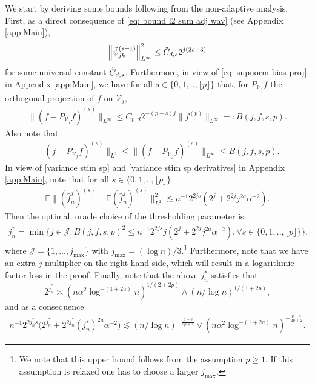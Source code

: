 \documentclass[preprint]{imsart}
\newcommand{\E}{{\mathbb E}}
\newcommand\norm[1]{\left\lVert#1\right\rVert}
\numberwithin{equation}{section}
\begin{document}
We start by deriving some bounds following from the non-adaptive analysis. First, as a direct consequence of \eqref{eq: bound l2 sum adj wav} (see Appendix \ref{app:Main}),
\begin{align}
 \norm{\tilde\psi_{jk}^{(s+1)}}_{L^\infty}^2\leq \Tilde{C}_{d,s} 2^{j(2s+3)}\label{UB:basis:deriv}
\end{align}
for some universal constant $\Tilde{C}_{d,s}$. Furthermore, in view of \eqref{eq: supnorm bias proj} in Appendix \ref{app:Main}, we have for all $s\in\{0,1,..,\lfloor p\rfloor\}$ that, for $P_{\mathcal{V}_j} f$ the orthogonal projection of $f$ on $\mathcal{V}_j$,
\begin{align}
\|(f-P_{\mathcal{V}_j} f)^{(s)}\|_{L^\infty}\leq C_{p,d} 2^{-(p-s) j}\|f^{(p)}\|_{L^{\infty}}=:B(j,f,s,p).\label{eq:def:B}
\end{align}
Also note that
\begin{align*}
\|( f-P_{\mathcal{V}_j} f)^{(s)}\|_{L^2}\leq \| (f-P_{\mathcal{V}_j} f)^{(s)}\|_{L^\infty}\leq B(j,f,s,p).
\end{align*}
In view of \eqref{variance stim sp} and \eqref{variance stim sp derivatives} in Appendix \ref{app:Main}, note that for all $s\in\{0,1,..,\lfloor p\rfloor\}$
\begin{align}
\E\|(\hat{f}_{n}^{j})^{(s)}-\E (\hat{f}_n^{j})^{(s)}\|_{L^2}^2\lesssim n^{-1}2^{2js}(2^{j}+2^{2j}j^{2a}\alpha^{-2}).\label{eq:UB:var}
\end{align}
Then the optimal, oracle choice of the thresholding parameter is
\begin{align}
j_n^*=\min\{j\in\mathcal{J}: B(j,f,s,p)^2\leq n^{-1}2^{2js}j(2^{j}+2^{2j}j^{2a}\alpha^{-2}), \forall s\in\{0,1,..,\lfloor p\rfloor\}\},\label{def:j*}
\end{align}
where $\mathcal{J}=\{1,...,j_{\max}\}$ with $j_{\max}=(\log n)/3$.\footnote{We note that this upper bound follows from the assumption $p\geq 1$. If this assumption is relaxed one has to choose a larger $j_{\max}$.} Furthermore, note that we have an extra $j$ multiplier on the right hand side, which will result in a logarithmic factor loss in the proof. Finally, note that the above $j_n^*$ satisfies that 
\begin{equation}
2^{j^*_n}\asymp (n\alpha^2\log^{-(1+2a)} n)^{1/(2+2p)}\wedge (n/\log n)^{1/(1+2p)},\label{eq:asymp:oracle}
\end{equation}
 and as a consequence
\begin{align}
 n^{-1}2^{2j_n^*s}\big(2^{j_n^*}+2^{2j_n^*}(j_n^*)^{2a}\alpha^{-2}\big)\lesssim (n/\log n)^{-\frac{p-s}{2p+1}}\vee  (n\alpha^2\log^{-(1+2a)} n)^{-\frac{p-s}{2p+2}}.\label{ub:var:jn*}
\end{align}
\end{document}
